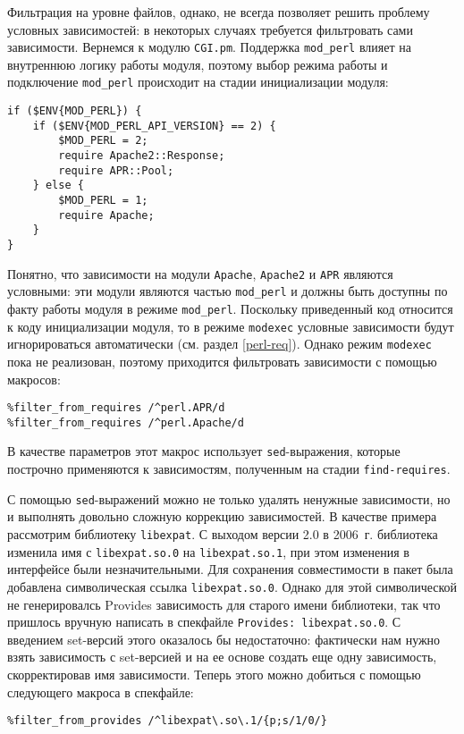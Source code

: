 \documentclass[russian,a4paper,12pt,titlepage]{article}
\begin{document}
Фильтрация на уровне файлов, однако, не всегда позволяет решить проблему условных зависимостей: в некоторых
случаях требуется фильтровать сами зависимости.  Вернемся к модулю \verb|CGI.pm|.  Поддержка \verb|mod_perl|
влияет на внутреннюю логику работы модуля, поэтому выбор режима работы и подключение \verb|mod_perl| происходит
на стадии инициализации модуля:
\begin{verbatim}
if ($ENV{MOD_PERL}) {
    if ($ENV{MOD_PERL_API_VERSION} == 2) {
        $MOD_PERL = 2;
        require Apache2::Response;
        require APR::Pool;
    } else {
        $MOD_PERL = 1;
        require Apache;
    }
}
\end{verbatim}
Понятно, что зависимости на модули \verb|Apache|, \verb|Apache2| и \verb|APR| являются условными:
эти модули являются частью \verb|mod_perl| и должны быть доступны по факту работы модуля в режиме \verb|mod_perl|.
Поскольку приведенный код относится к коду инициализации модуля, то в режиме \verb|modexec| условные зависимости
будут игнорироваться автоматически (см. раздел \ref{perl-req}).  Однако режим \verb|modexec| пока не реализован,
поэтому приходится фильтровать зависимости с помощью макросов:
\begin{verbatim}
%filter_from_requires /^perl.APR/d
%filter_from_requires /^perl.Apache/d
\end{verbatim}
В качестве параметров этот макрос использует \verb|sed|-выражения, которые построчно применяются к зависимостям,
полученным на стадии \verb|find-requires|.

С помощью \verb|sed|-выражений можно не только удалять ненужные зависимости, но и выполнять довольно сложную коррекцию зависимостей.
В качестве примера рассмотрим библиотеку \verb|libexpat|.  С выходом версии 2.0 в 2006~г. библиотека изменила имя с \verb|libexpat.so.0|
на \verb|libexpat.so.1|, при этом изменения в интерфейсе были незначительными.  Для сохранения совместимости в пакет была добавлена
символическая ссылка \verb|libexpat.so.0|.  Однако для этой символической не генерировалсь Provides зависимость для старого имени
библиотеки, так что пришлось вручную написать в спекфайле \verb|Provides: libexpat.so.0|.  С введением set-версий этого оказалось
бы недостаточно: фактически нам нужно взять зависимость с set-версией и на ее основе создать еще одну зависимость, скорректировав
имя зависимости.  Теперь этого можно добиться с помощью следующего макроса в спекфайле:
\begin{verbatim}
%filter_from_provides /^libexpat\.so\.1/{p;s/1/0/}
\end{verbatim}
\end{document}
